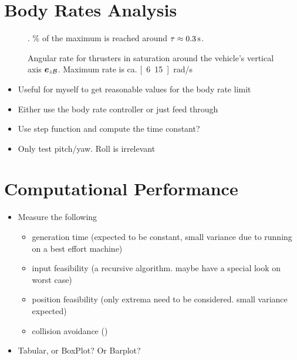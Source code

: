 \section{Body Rates Analysis}
\begin{figure}
	\centering
	\caption{Angular rate for thrusters in saturation around the vehicle's vertical axis $\mbox{$\bm{e}$}_{z\mathcal{B}}$. Maximum rate is ca. \unit[6.15]{rad/s}}. \unit[63]{\%} of the maximum is reached around $\tau \approx \unit[0.3]{s}$.
\end{figure}

\begin{itemize}
	\color{red}
	\item Useful for myself to get reasonable values for the body rate limit
	\item Either use the body rate controller or just feed through
	\item Use step function and compute the time constant?
	\item Only test pitch/yaw. Roll is irrelevant
\end{itemize}

\section{Computational Performance}

\begin{itemize}
	\color{red}
	\item Measure the following
	\begin{itemize}
		\item generation time (expected to be constant, small variance due to running on a best effort machine)
		\item input feasibility (a recursive algorithm. maybe have a special look on worst case)
		\item position feasibility (only extrema need to be considered. small variance expected)
		\item collision avoidance ()
	\end{itemize}
	\item Tabular, or BoxPlot? Or Barplot? 
\end{itemize}

